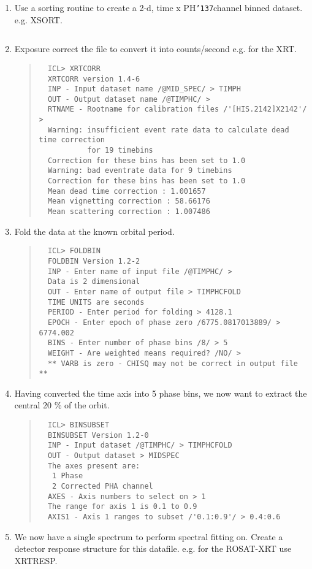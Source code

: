 \documentclass{book}
\renewcommand{\_}{{\tt\char'137}}     %
\begin{document}
\begin{enumerate}
\item Use a sorting routine to create a 2-d, time x PH\_channel
binned dataset. e.g. XSORT.

\begin{verbatim}
  \end{verbatim}
\item Exposure correct the file to convert it into counts/second
e.g. for the XRT.

\begin{quote}\begin{verbatim}
  ICL> XRTCORR
  XRTCORR version 1.4-6
  INP - Input dataset name /@MID_SPEC/ > TIMPH
  OUT - Output dataset name /@TIMPHC/ >
  RTNAME - Rootname for calibration files /'[HIS.2142]X2142'/ >
  Warning: insufficient event rate data to calculate dead time correction
           for 19 timebins
  Correction for these bins has been set to 1.0
  Warning: bad eventrate data for 9 timebins
  Correction for these bins has been set to 1.0
  Mean dead time correction : 1.001657
  Mean vignetting correction : 58.66176
  Mean scattering correction : 1.007486
  \end{verbatim}\end{quote}
\item Fold the data at the known orbital period.

\begin{quote}\begin{verbatim}
  ICL> FOLDBIN
  FOLDBIN Version 1.2-2
  INP - Enter name of input file /@TIMPHC/ >
  Data is 2 dimensional
  OUT - Enter name of output file > TIMPHCFOLD
  TIME UNITS are seconds
  PERIOD - Enter period for folding > 4128.1
  EPOCH - Enter epoch of phase zero /6775.0817013889/ > 6774.002
  BINS - Enter number of phase bins /8/ > 5
  WEIGHT - Are weighted means required? /NO/ >
  ** VARB is zero - CHISQ may not be correct in output file **
  \end{verbatim}\end{quote}
\item Having converted the time axis into 5 phase bins, we now want to
extract the central 20 \% of the orbit.

\begin{quote}\begin{verbatim}
  ICL> BINSUBSET
  BINSUBSET Version 1.2-0
  INP - Input dataset /@TIMPHC/ > TIMPHCFOLD
  OUT - Output dataset > MIDSPEC
  The axes present are:
   1 Phase
   2 Corrected PHA channel
  AXES - Axis numbers to select on > 1
  The range for axis 1 is 0.1 to 0.9
  AXIS1 - Axis 1 ranges to subset /'0.1:0.9'/ > 0.4:0.6
  \end{verbatim}\end{quote}
\item We now have a single spectrum to perform spectral fitting on.
Create a detector response structure for this datafile. e.g.
for the ROSAT-XRT use XRTRESP.


\end{enumerate}
\end{document}
